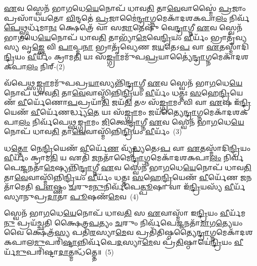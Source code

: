 \-\ul{𑌏}\-𑌵 𑌸𑍍𑌵𑍇𑌨᳴ 𑌭𑌾\-\ul{𑌗}\-𑌧𑍇\-\ul{𑌯𑍇}\-𑌨𑍋𑌪᳴ 𑌧𑌾𑌵\-\ul{𑌤𑌿} 𑌤𑌾\-\ul{𑌵𑍇}\-𑌵𑌾𑌸𑍍𑌮𑍈॑ \ul{𑌪𑍍𑌰}\-𑌜𑌾𑌂 𑌪𑍍𑌰𑌸𑌾᳴𑌧𑌯𑌤𑍋 \ul{𑌵𑌿}\-𑌨𑍍𑌦𑌤𑍇॑ \ul{𑌪𑍍𑌰}\-𑌜𑌾𑌮𑍈॑\-\ul{𑌨𑍍𑌦𑍍𑌰𑌾}\-𑌗𑍍𑌨𑌮𑍇𑌕𑌾᳴\-𑌦𑌶\-𑌕𑌪𑌾\-\ul{𑌲𑌂} 𑌨𑌿𑌰𑍍𑌵᳴\-\ul{𑌪𑍇}\-𑌥𑍍𑌸𑍍𑌪𑌰𑍍𑌧᳴𑌮𑌾\-\ul{𑌨𑌃} 𑌕𑍍𑌷𑍇𑌤𑍍𑌰𑍇᳴ 𑌵𑌾 𑌸\-\ul{𑌜𑌾}\-𑌤𑍇𑌷𑍁᳴ 𑌵𑍇\-\ul{𑌨𑍍𑌦𑍍𑌰𑌾}\-𑌗𑍍𑌨𑍀 \ul{𑌏}\-𑌵 𑌸𑍍𑌵𑍇𑌨᳴ 𑌭𑌾\-\ul{𑌗}\-𑌧𑍇\-\ul{𑌯𑍇}\-𑌨𑍋𑌪᳴ 𑌧𑌾𑌵\-\ul{𑌤𑌿} 𑌤𑌾𑌭𑍍𑌯𑌾᳴\-\ul{𑌮𑍇}\-𑌵𑍇\-\ul{𑌨𑍍𑌦𑍍𑌰𑌿}\-𑌯𑌂 \ul{𑌵𑍀}\-𑌰𑍍𑌯𑌂᳴ 𑌭𑍍𑌰𑌾𑌤𑍃᳴𑌵𑍍𑌯𑌸𑍍𑌯 𑌵𑍃\-\ul{𑌙𑍍𑌕𑍍𑌤𑍇} 𑌵𑌿 \ul{𑌪𑌾}\-𑌪𑍍𑌮\-\ul{𑌨𑌾} 𑌭𑍍𑌰𑌾𑌤𑍃᳴𑌵𑍍𑌯𑍇𑌣 𑌜\-\ul{𑌯}\-𑌤𑍇\-𑌽\-\ul{𑌪} 𑌵𑌾 \ul{𑌏}\-𑌤𑌸𑍍𑌮𑌾᳴𑌦𑌿\-\ul{𑌨𑍍𑌦𑍍𑌰𑌿}\-𑌯𑌂 \ul{𑌵𑍀}\-𑌰𑍍𑌯𑌂᳴ 𑌕𑍍𑌰𑌾𑌮\-\ul{𑌤𑌿} 𑌯𑌃 𑌸᳴\-\ul{𑌙𑍍𑌗𑍍𑌰𑌾}\-𑌮𑌮𑍁᳴𑌪\-\ul{𑌪𑍍𑌰}\-𑌯𑌾𑌤𑍍𑌯𑍈॑\-\ul{𑌨𑍍𑌦𑍍𑌰𑌾}\-𑌗𑍍𑌨𑌮𑍇𑌕𑌾᳴\-𑌦𑌶\-𑌕𑌪𑌾\-\ul{𑌲𑌂} 𑌨𑌿𑌰𑍍-(2)

𑌵᳴𑌪𑍇𑌥𑍍𑌸\-\ul{𑌙𑍍𑌗𑍍𑌰𑌾}\-𑌮𑌮𑍁᳴𑌪𑌪𑍍𑌰\-\ul{𑌯𑌾}\-𑌸𑍍𑌯𑌨𑍍𑌨𑌿᳴\-\ul{𑌨𑍍𑌦𑍍𑌰𑌾}\-𑌗𑍍𑌨𑍀 \ul{𑌏}\-𑌵 𑌸𑍍𑌵𑍇𑌨᳴ 𑌭𑌾\-\ul{𑌗}\-𑌧𑍇\-\ul{𑌯𑍇}\-𑌨𑍋𑌪᳴ 𑌧𑌾𑌵\-\ul{𑌤𑌿} 𑌤𑌾\-\ul{𑌵𑍇}\-𑌵𑌾𑌸𑍍𑌮𑌿᳴𑌨𑍍𑌨𑌿\-\ul{𑌨𑍍𑌦𑍍𑌰𑌿}\-𑌯𑌂 \ul{𑌵𑍀}\-𑌰𑍍𑌯𑌂᳴ 𑌧𑌤𑍍𑌤𑌃 \ul{𑌸}\-𑌹𑍇\-\ul{𑌨𑍍𑌦𑍍𑌰𑌿}\-𑌯𑍇𑌣᳴ \ul{𑌵𑍀}\-𑌰𑍍𑌯𑍇᳴𑌣𑍋\-\ul{𑌪}\-𑌪𑍍𑌰𑌯𑌾᳴\-\ul{𑌤𑌿} 𑌜𑌯᳴\-\ul{𑌤𑌿} 𑌤𑍞 𑌸᳴\-\ul{𑌙𑍍𑌗𑍍𑌰𑌾}\-𑌮𑌂 𑌵𑌿 𑌵𑌾 \ul{𑌏}\-𑌷 𑌇᳴\-\ul{𑌨𑍍𑌦𑍍𑌰𑌿}\-𑌯𑍇𑌣᳴ \ul{𑌵𑍀}\-𑌰𑍍𑌯𑍇᳴𑌣𑌰𑍍𑌦𑍍𑌧𑍍𑌯\-\ul{𑌤𑍇} 𑌯𑌃 𑌸᳴\-\ul{𑌙𑍍𑌗𑍍𑌰𑌾}\-𑌮𑌂 𑌜𑌯᳴𑌤𑍍𑌯𑍈\-\ul{𑌨𑍍𑌦𑍍𑌰𑌾}\-𑌗𑍍𑌨𑌮𑍇𑌕𑌾᳴\-𑌦𑌶\-𑌕𑌪𑌾\-\ul{𑌲𑌂} 𑌨𑌿𑌰𑍍𑌵᳴𑌪𑍇𑌥𑍍𑌸\-\ul{𑌙𑍍𑌗𑍍𑌰𑌾}\-𑌮𑌂 \ul{𑌜𑌿}\-𑌤𑍍𑌵𑍇\-\ul{𑌨𑍍𑌦𑍍𑌰𑌾}\-𑌗𑍍𑌨𑍀 \ul{𑌏}\-𑌵 𑌸𑍍𑌵𑍇𑌨᳴ 𑌭𑌾\-\ul{𑌗}\-𑌧𑍇\-\ul{𑌯𑍇}\-𑌨𑍋𑌪᳴ 𑌧𑌾𑌵\-\ul{𑌤𑌿} 𑌤𑌾\-\ul{𑌵𑍇}\-𑌵𑌾𑌸𑍍𑌮𑌿᳴𑌨𑍍𑌨𑌿\-\ul{𑌨𑍍𑌦𑍍𑌰𑌿}\-𑌯𑌂 \ul{𑌵𑍀}\-𑌰𑍍𑌯𑌂᳴~(3)

𑌧\-\ul{𑌤𑍍𑌤𑍋} 𑌨𑍇\-\ul{𑌨𑍍𑌦𑍍𑌰𑌿}\-𑌯𑍇𑌣᳴ \ul{𑌵𑍀}\-𑌰𑍍𑌯𑍇᳴\-\ul{𑌣} 𑌵𑍍𑌯𑍃᳴\-\ul{𑌦𑍍𑌧𑍍𑌯}\-𑌤𑍇\-𑌽\-\ul{𑌪} 𑌵𑌾 \ul{𑌏}\-𑌤𑌸𑍍𑌮𑌾᳴𑌦𑌿\-\ul{𑌨𑍍𑌦𑍍𑌰𑌿}\-𑌯𑌂 \ul{𑌵𑍀}\-𑌰𑍍𑌯𑌂᳴ 𑌕𑍍𑌰𑌾𑌮\-\ul{𑌤𑌿} 𑌯 𑌏𑌤𑌿᳴ \ul{𑌜}\-𑌨𑌤𑌾᳴𑌮𑍈\-\ul{𑌨𑍍𑌦𑍍𑌰𑌾}\-𑌗𑍍𑌨𑌮𑍇𑌕𑌾᳴\-𑌦𑌶\-𑌕𑌪𑌾\-\ul{𑌲𑌂} 𑌨𑌿𑌰𑍍𑌵᳴𑌪𑍇\-\ul{𑌜𑍍𑌜}\-𑌨𑌤𑌾᳴\-\-\ul{𑌮𑍇}\-𑌷𑍍𑌯𑌨𑍍𑌨𑌿᳴\-\ul{𑌨𑍍𑌦𑍍𑌰𑌾}\-𑌗𑍍𑌨𑍀 \ul{𑌏}\-𑌵 𑌸𑍍𑌵𑍇𑌨᳴ 𑌭𑌾\-\ul{𑌗}\-𑌧𑍇\-\ul{𑌯𑍇}\-𑌨𑍋𑌪᳴ 𑌧𑌾𑌵\-\ul{𑌤𑌿} 𑌤𑌾\-\ul{𑌵𑍇}\-𑌵𑌾𑌸𑍍𑌮𑌿᳴𑌨𑍍𑌨𑌿\-\ul{𑌨𑍍𑌦𑍍𑌰𑌿}\-𑌯𑌂 \ul{𑌵𑍀}\-𑌰𑍍𑌯𑌂᳴ 𑌧𑌤𑍍𑌤𑌃 \ul{𑌸}\-𑌹𑍇\-\ul{𑌨𑍍𑌦𑍍𑌰𑌿}\-𑌯𑍇𑌣᳴ \ul{𑌵𑍀}\-𑌰𑍍𑌯𑍇᳴𑌣 \ul{𑌜}\-𑌨𑌤𑌾᳴𑌮𑍇𑌤𑌿 \ul{𑌪𑍗}\-𑌷𑍍𑌣𑌂 \ul{𑌚}\-𑌰𑍁𑌮\-\ul{𑌨𑍁}\-𑌨𑌿𑌰𑍍𑌵᳴𑌪𑍇\-\ul{𑌤𑍍𑌪𑍂}\-𑌷𑌾 𑌵𑌾 𑌇᳴\-\ul{𑌨𑍍𑌦𑍍𑌰𑌿}\-𑌯𑌸𑍍𑌯᳴ \ul{𑌵𑍀}\-𑌰𑍍𑌯᳴𑌸𑍍𑌯𑌾𑌨𑍁𑌪𑍍𑌰\-\ul{𑌦𑌾}\-𑌤𑌾 \ul{𑌪𑍂}\-𑌷𑌣᳴\-\ul{𑌮𑍇}\-𑌵~(4)

𑌸𑍍𑌵𑍇𑌨᳴ 𑌭𑌾\-\ul{𑌗}\-𑌧𑍇\-\ul{𑌯𑍇}\-𑌨𑍋𑌪᳴ 𑌧𑌾𑌵\-\ul{𑌤𑌿} 𑌸 \ul{𑌏}\-𑌵𑌾𑌸𑍍𑌮𑌾᳴ 𑌇\-\ul{𑌨𑍍𑌦𑍍𑌰𑌿}\-𑌯𑌂 \ul{𑌵𑍀}\-𑌰𑍍𑌯᳴𑌮\-\ul{𑌨𑍁} 𑌪𑍍𑌰𑌯᳴𑌚𑍍𑌛𑌤𑌿 𑌕𑍍𑌷𑍈𑌤𑍍𑌰\-\ul{𑌪}\-𑌤𑍍𑌯𑌂 \ul{𑌚}\-𑌰𑍁𑌂 𑌨𑌿𑌰𑍍𑌵᳴𑌪𑍇\-\ul{𑌜𑍍𑌜}\-𑌨𑌤𑌾᳴\-\ul{𑌮𑌾}\-𑌗\-\ul{𑌤𑍍𑌯𑍇}\-𑌯𑌂 𑌵𑍈 𑌕𑍍𑌷𑍇𑌤𑍍𑌰᳴\-\ul{𑌸𑍍𑌯} 𑌪𑌤𑌿᳴\-\ul{𑌰}\-𑌸𑍍𑌯𑌾\-\ul{𑌮𑍇}\-𑌵 𑌪𑍍𑌰𑌤𑌿᳴𑌤𑌿𑌷𑍍𑌠𑌤𑍍𑌯𑍈\-\ul{𑌨𑍍𑌦𑍍𑌰𑌾}\-𑌗𑍍𑌨𑌮𑍇𑌕𑌾᳴\-𑌦𑌶\-𑌕𑌪𑌾𑌲\-\ul{𑌮𑍁}\-𑌪𑌰𑌿᳴\-\ul{𑌷𑍍𑌟𑌾}\-\-𑌨𑍍𑌨𑌿𑌰𑍍𑌵᳴𑌪𑍇\-\ul{𑌦}\-𑌸𑍍𑌯𑌾\-\ul{𑌮𑍇}\-𑌵 𑌪𑍍𑌰᳴\-\ul{𑌤𑌿}\-𑌷𑍍𑌠𑌾𑌯𑍇॑\-\ul{𑌨𑍍𑌦𑍍𑌰𑌿}\-𑌯𑌂 \ul{𑌵𑍀}\-𑌰𑍍𑌯᳴\-\ul{𑌮𑍁}\-𑌪𑌰𑌿᳴𑌷𑍍𑌟𑌾\-\ul{𑌦𑌾}\-𑌤𑍍𑌮𑌨𑍍𑌧᳴𑌤𑍍𑌤𑍇॥~(5)

{\anuvakamend[{\-\ul{𑌪𑍍𑌰}\-𑌜𑌾𑌕𑌾᳴𑌮 𑌇\-\ul{𑌨𑍍𑌦𑍍𑌰𑌾}\-𑌗𑍍𑌨𑍀 𑌉᳴𑌪\-\ul{𑌪𑍍𑌰}\-𑌯𑌾𑌤𑍍𑌯𑍈॑\-\ul{𑌨𑍍𑌦𑍍𑌰𑌾}\-𑌗𑍍𑌨𑌮𑍇𑌕𑌾᳴\-𑌦𑌶\-𑌕𑌪𑌾\-\ul{𑌲𑌂} 𑌨𑌿\-\ul{𑌰𑍍𑌵𑍀}\-𑌰𑍍𑌯𑌂᳴ \ul{𑌪𑍂}\-𑌷𑌣᳴\-\ul{𑌮𑍇}\-𑌵𑍈\-\ul{𑌕𑌾}\-𑌨𑍍𑌨𑌚᳴𑌤𑍍𑌵𑌾\-\ul{𑌰𑌿}\-\-\ul{𑍞}\-𑌶𑌚𑍍𑌚᳴}]}

